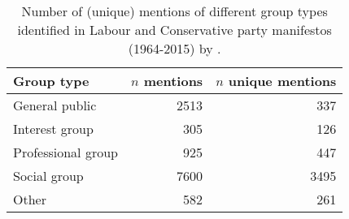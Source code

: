 \begin{table}[!h]

\caption{\label{tab:thau2019_group_type_counts}Number of (unique) mentions of different group types identified in Labour and Conservative party manifestos (1964-2015) by \citet{thau_how_2019}.}
\centering
\fontsize{10}{12}\selectfont
\begin{tabular}[t]{lrr}
\toprule
Group type & $n$ mentions & $n$ unique mentions\\
\midrule
General public & 2513 & 337\\
Interest group & 305 & 126\\
Professional group & 925 & 447\\
Social group & 7600 & 3495\\
Other & 582 & 261\\
\bottomrule
\end{tabular}
\end{table}
